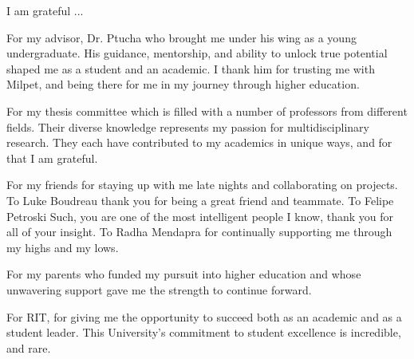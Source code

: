 \documentclass[12pt,american]{report}
\begin{document}
%
\vfill
\begin{center}
\indent I am grateful ...


For my advisor, Dr. Ptucha who brought me under his wing as a young undergraduate.  His guidance, mentorship, and ability to unlock true potential shaped me as a student and an academic.  I thank him for trusting me with Milpet, and being there for me in my journey through higher education.  


For my thesis committee which is filled with a number of professors from different fields.  Their diverse knowledge represents my passion for multidisciplinary research.  They each have contributed to my academics in unique ways, and for that I am grateful.


For my friends for staying up with me late nights and collaborating on projects.  To Luke Boudreau thank you for being a great friend and teammate.  To Felipe Petroski Such, you are one of the most intelligent people I know, thank you for all of your insight. To Radha Mendapra for continually supporting me through my highs and my lows.


For my parents who funded my pursuit into higher education and whose unwavering support gave me the strength to continue forward.


For RIT, for giving me the opportunity to succeed both as an academic and as a student leader.  This University's commitment to student excellence is incredible, and rare.


\end{center}
\vfill

\newcommand{\etc} {\emph{etc.\/}}
\newcommand{\etal}{\emph{et~al.\/}}
\newcommand{\eg}  {\emph{e.g.\/}}
\newcommand{\ie}  {\emph{i.e.\/}}
\end{document}
